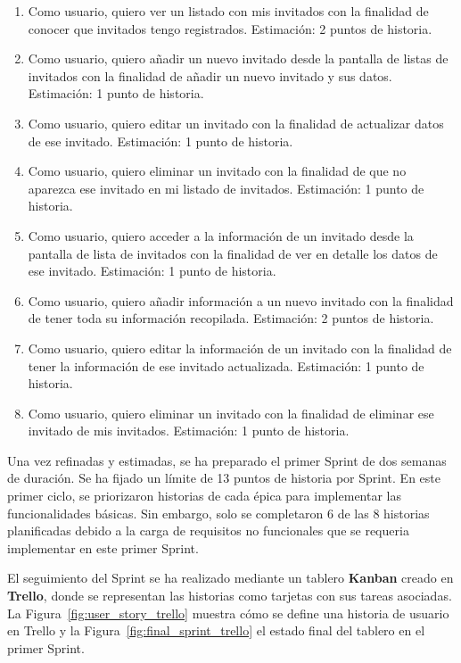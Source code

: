 \begin{enumerate}
  \item Como usuario, quiero ver un listado con mis invitados con la finalidad de conocer que invitados tengo registrados. Estimación: 2 puntos de historia.
  \item Como usuario, quiero añadir un nuevo invitado desde la pantalla de listas de invitados con la finalidad de añadir un nuevo invitado y sus datos. Estimación: 1 punto de historia.
  \item Como usuario, quiero editar un invitado con la finalidad de actualizar datos de ese invitado. Estimación: 1 punto de historia.
  \item Como usuario, quiero eliminar un invitado con la finalidad de que no aparezca ese invitado en mi listado de invitados. Estimación: 1 punto de historia.
  \item Como usuario, quiero acceder a la información de un invitado desde la pantalla de lista de invitados con la finalidad de ver en detalle los datos de ese invitado. Estimación: 1 punto de historia.
  \item Como usuario, quiero añadir información a un nuevo invitado con la finalidad de tener toda su información recopilada. Estimación: 2 puntos de historia.
  \item Como usuario, quiero editar la información de un invitado con la finalidad de tener la información de ese invitado actualizada. Estimación: 1 punto de historia.
  \item Como usuario, quiero eliminar un invitado con la finalidad de eliminar ese invitado de mis invitados. Estimación: 1 punto de historia.
\end{enumerate}

Una vez refinadas y estimadas, se ha preparado el primer Sprint de dos semanas de duración. Se ha fijado un límite de 13 puntos de historia por Sprint. En este primer ciclo, se priorizaron historias de cada \'epica para implementar las funcionalidades básicas. Sin embargo, solo se completaron 6 de las 8 historias planificadas debido a la carga de requisitos no funcionales que se requeria implementar en este primer Sprint.

El seguimiento del Sprint se ha realizado mediante un tablero \textbf{Kanban} creado en \textbf{Trello}, donde se representan las historias como tarjetas con sus tareas asociadas. La Figura~\ref{fig:user_story_trello} muestra cómo se define una historia de usuario en Trello y la Figura~\ref{fig:final_sprint_trello} el estado final del tablero en el primer Sprint.

